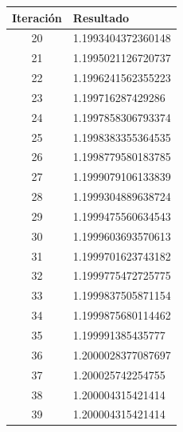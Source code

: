 \documentclass[titlepage,a4paper]{article}
\begin{document}
\begin{multicols}{2}
\begin{center}
\begin{tabular}{| c | l |}
                \hline
        \end{tabular}
    \end{center}
    \begin{center}
        \begin{tabular}{| c | l |}
        \hline
         Iteración & Resultado \\ \hline
        20     &  1.1993404372360148 \\
        21     &  1.1995021126720737 \\
        22     &  1.1996241562355223 \\
        23     &  1.199716287429286 \\
        24     &  1.1997858306793374 \\
        25     &  1.1998383355364535 \\
        26     &  1.1998779580183785 \\
        27     &  1.1999079106133839 \\
        28     &  1.1999304889638724 \\
        29     &  1.1999475560634543 \\
        30     &  1.1999603693570613 \\
        31     &  1.1999701623743182 \\
        32     &  1.1999775472725775 \\
        33     &  1.1999837505871154 \\
        34     &  1.1999875680114462 \\
        35     &  1.199991385435777 \\
        36     &  1.2000028377087697 \\
        37     &  1.200025742254755 \\
        38     &  1.200004315421414 \\
        39     &  1.200004315421414 \\
        \hline
        \end{tabular}
    \end{center}
\end{multicols}
\end{document}
